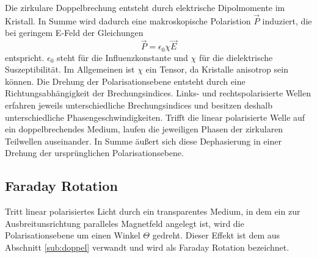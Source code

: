 Die zirkulare Doppelbrechung entsteht durch elektrische Dipolmomente im Kristall.
In Summe wird dadurch eine makroskopische Polaristion $\vec{P}$ induziert, die bei geringem E-Feld der Gleichungen
\begin{equation*}
    \vec{P} = \epsilon_0 \chi \vec{E}
\end{equation*}
entspricht.
$\epsilon_0$ steht für die Influenzkonstante und $\chi$ für die dielektrische Suszeptibilität.
Im Allgemeinen ist $\chi$ ein Tensor, da Kristalle anisotrop sein können.
Die Drehung der Polarisationsebene entsteht durch eine Richtungsabhängigkeit der Brechungsindices. 
Links- und rechtspolarisierte Wellen erfahren jeweils unterschiedliche Brechungsindices und besitzen deshalb unterschiedliche Phasengeschwindigkeiten.
Trifft die linear polarisierte Welle auf ein doppelbrechendes Medium, laufen die jeweiligen Phasen der zirkularen Teilwellen auseinander.
In Summe äußert sich diese Dephasierung in einer Drehung der ursprünglichen Polarisationsebene.


\subsection{Faraday Rotation}
Tritt linear polarisiertes Licht durch ein transparentes Medium, in dem ein zur Ausbreitunsrichtung paralleles Magnetfeld angelegt ist, wird die Polarisationsebene um einen Winkel $\Theta$ gedreht.
Dieser Effekt ist dem aus Abschnitt \ref{sub:doppel} verwandt und wird als Faraday Rotation bezeichnet.



